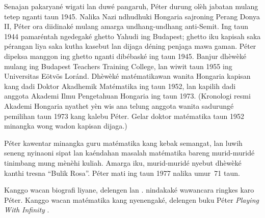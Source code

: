 \documentclass[../../../include/open-logic-section]{subfiles}
\begin{document}
Senajan pakaryané wigati
lan duwé pangaruh,
P\'eter durung olèh
jabatan mulang tetep
nganti taun 1945.
Nalika Nazi ndhudhuki
Hongaria sajroning
Perang Donya II,
P\'eter ora diidinaké
mulang amarga
undhang-undhang
anti-Semit. Ing taun
1944 pamaréntah
ngedegaké ghetto
Yahudi ing Budapest;
ghetto iku kapisah
saka pérangan liya saka kutha kasebut
lan dijaga déning
penjaga mawa gaman.
P\'eter dipeksa
manggon ing ghetto
nganti dibébaské
ing taun 1945.
Banjur dhèwèké
mulang ing
Budapest Teachers
Training College,
lan wiwit taun
1955 ing Universitas
E\"otv\"os Lor\'and.
Dhèwèké matématikawan
wanita Hongaria
kapisan kang dadi
Doktor Akadhemik
Matématika ing taun 1952, lan
kapilih dadi anggota Akademi
Ilmu Pengetahuan Hongaria
ing taun 1973.
(Kronologi resmi Akademi Hongaria nyathet yèn wis ana telung anggota wanita sadurungé pemilihan taun 1973 kang kalebu Péter. Gelar doktor matématika taun 1952 minangka wong wadon kapisan dijaga.)

P\'{e}ter kawentar
minangka guru
matématika kang
kebak semangat,
lan luwih seneng
nyinaoni sipat
lan kaéndahan
masalah matématika
bareng murid-muridé
tinimbang mung
mènèhi kuliah.
Amarga iku,
murid-muridé
nyebut dhèwèké
kanthi tresna
``Bulik Rosa''.
P\'eter mati
ing taun 1977
nalika umur~71 taun.

\begin{reading}
Kanggo wacan biografi
liyane, delengen
\citep{Oconnor2014}
lan \citep{Andrasfai1986}.
\citet{Tamassy1994}
nindakaké wawancara
ringkes karo P\'eter.
Kanggo wacan matématika
kang nyenengaké,
delengen buku P\'eter
\emph{Playing With Infinity}
\citep{Peter2010}.
\end{reading}
\end{document}
